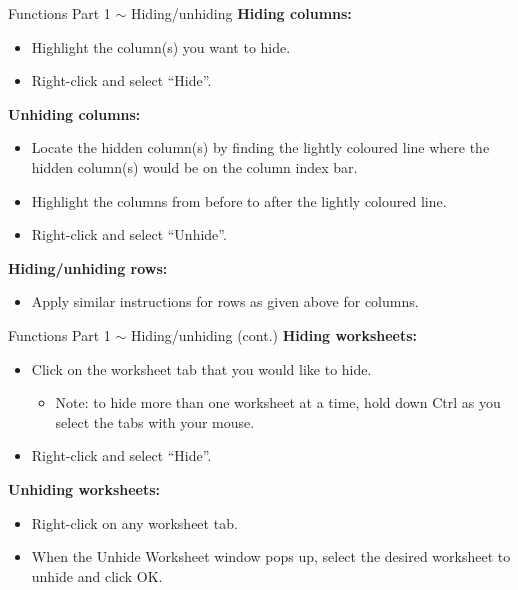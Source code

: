 \documentclass{beamer}
\begin{document}
\begin{frame}{Functions Part 1 $\sim$ Hiding/unhiding}
\small
\textbf{Hiding columns:}
\begin{itemize}
  \item Highlight the column(s) you want to hide.
  \item Right-click and select ``Hide''.
\end{itemize}
\textbf{Unhiding columns:}
\begin{itemize}
  \item Locate the hidden column(s) by finding the lightly coloured line where the
        hidden column(s) would be on the column index bar.
  \item Highlight the columns from before to after the lightly coloured line.
  \item Right-click and select ``Unhide''.
\end{itemize}
\textbf{Hiding/unhiding rows:}
\begin{itemize}
  \item Apply similar instructions for rows as given above for columns.
\end{itemize}
\end{frame}

\begin{frame}{Functions Part 1 $\sim$ Hiding/unhiding (cont.)}
\textbf{Hiding worksheets:}
\begin{itemize}
  \item Click on the worksheet tab that you would like to hide.
  \begin{itemize}
    \item Note: to hide more than one worksheet at a time, hold down Ctrl as you
          select the tabs with your mouse.
  \end{itemize}
  \item Right-click and select ``Hide''.
\end{itemize}
\textbf{Unhiding worksheets:}
\begin{itemize}
  \item Right-click on any worksheet tab.
  \item When the Unhide Worksheet window pops up, select the desired worksheet to
        unhide and click OK.
\end{itemize}
\end{frame}
\end{document}
